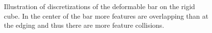 \begin{figure}[h!]
\begin{minipage}[b]{0.33 \linewidth}
 	\end{minipage}
 	 	\begin{minipage}[b]{0.33 \linewidth}
 	 		\centering
 	 	\end{minipage}
 
   \caption[Illustration of discretizations of the deformable bar on the rigid cube.]{Illustration of discretizations of the deformable bar on the rigid cube. In the center of the bar more features are overlapping than at the edging and thus there are more feature collisions.}
   \label{fig::defCubeVsBar}
 \end{figure}
 
